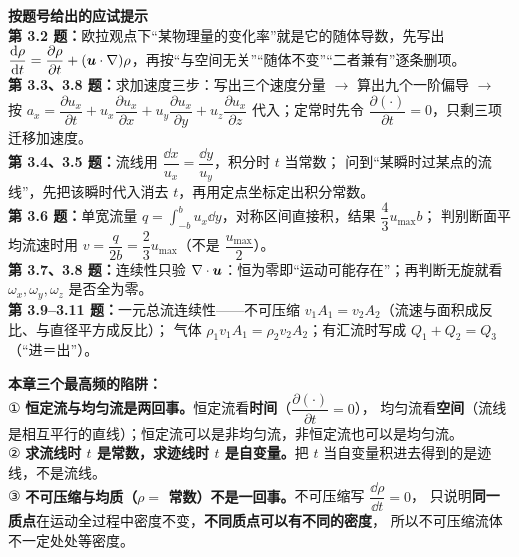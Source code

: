 \begin{banfa}
\textbf{按题号给出的应试提示}\\
\textbf{第 3.2 题：}欧拉观点下“某物理量的变化率”就是它的随体导数，先写出
$\dfrac{\mathrm{d}\rho}{\mathrm{d} t}=\dfrac{\partial\rho}{\partial t}+(\bm{u}\cdot\nabla)\rho$，再按“与空间无关”“随体不变”“二者兼有”逐条删项。\\
\textbf{第 3.3、3.8 题：}求加速度三步：写出三个速度分量 $\to$ 算出九个一阶偏导 $\to$ 按
$a_x=\dfrac{\partial u_x}{\partial t}+u_x\dfrac{\partial u_x}{\partial x}+u_y\dfrac{\partial u_x}{\partial y}+u_z\dfrac{\partial u_x}{\partial z}$
代入；定常时先令 $\dfrac{\partial(\cdot)}{\partial t}=0$，只剩三项迁移加速度。\\
\textbf{第 3.4、3.5 题：}流线用 $\dfrac{\dd x}{u_x}=\dfrac{\dd y}{u_y}$，积分时 $t$ 当常数；
问到“某瞬时过某点的流线”，先把该瞬时代入消去 $t$，再用定点坐标定出积分常数。\\
\textbf{第 3.6 题：}单宽流量 $q=\displaystyle\int_{-b}^{b}u_x\dd y$，对称区间直接积，结果 $\dfrac{4}{3}u_{\max}b$；
判别断面平均流速时用 $v=\dfrac{q}{2b}=\dfrac{2}{3}u_{\max}$（不是 $\dfrac{u_{\max}}{2}$）。\\
\textbf{第 3.7、3.8 题：}连续性只验 $\nabla\cdot\bm{u}$：恒为零即“运动可能存在”；再判断无旋就看
$\omega_x,\omega_y,\omega_z$ 是否全为零。\\
\textbf{第 3.9--3.11 题：}一元总流连续性——不可压缩 $v_1A_1=v_2A_2$（流速与面积成反比、与直径平方成反比）；
气体 ${\rho_1v_1A_1=\rho_2v_2A_2}$；有汇流时写成 $Q_1+Q_2=Q_3$（“进＝出”）。
\end{banfa}

\begin{yicuo}
\textbf{本章三个最高频的陷阱：}\\
① \textbf{恒定流与均匀流是两回事。}恒定流看\textbf{时间}（$\dfrac{\partial(\cdot)}{\partial t}=0$），
均匀流看\textbf{空间}（流线是相互平行的直线）；恒定流可以是非均匀流，非恒定流也可以是均匀流。\\
② \textbf{求流线时 $t$ 是常数，求迹线时 $t$ 是自变量。}把 $t$ 当自变量积进去得到的是迹线，不是流线。\\
③ \textbf{不可压缩与均质（$\rho=$ 常数）不是一回事。}不可压缩写 $\dfrac{\dd\rho}{\dd t}=0$，
只说明\textbf{同一质点}在运动全过程中密度不变，\textbf{不同质点可以有不同的密度}，
所以不可压缩流体不一定处处等密度。
\end{yicuo}
